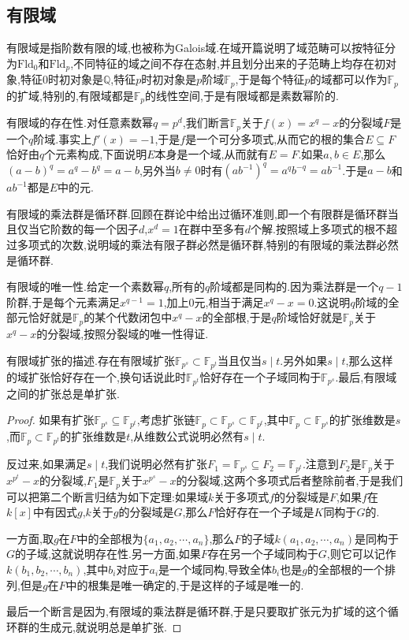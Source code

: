 \subsection{有限域}

有限域是指阶数有限的域,也被称为Galois域.在域开篇说明了域范畴可以按特征分为$\mathrm{Fld}_0$和$\mathrm{Fld}_p$,不同特征的域之间不存在态射,并且划分出来的子范畴上均存在初对象,特征0时初对象是$\mathbb{Q}$,特征$p$时初对象是$p$阶域$\mathbb{F}_p$,于是每个特征$p$的域都可以作为$\mathbb{F}_p$的扩域,特别的,有限域都是$\mathbb{F}_p$的线性空间,于是有限域都是素数幂阶的.

有限域的存在性.对任意素数幂$q=p^d$,我们断言$\mathbb{F}_p$关于$f(x)=x^q-x$的分裂域$F$是一个$q$阶域.事实上$f'(x)=-1$,于是$f$是一个可分多项式,从而它的根的集合$E\subseteq F$恰好由$q$个元素构成,下面说明$E$本身是一个域,从而就有$E=F$.如果$a,b\in E$,那么$(a-b)^q=a^q-b^q=a-b$,另外当$b\not=0$时有$(ab^{-1})^q=a^qb^{-q}=ab^{-1}$.于是$a-b$和$ab^{-1}$都是$E$中的元.

有限域的乘法群是循环群.回顾在群论中给出过循环准则,即一个有限群是循环群当且仅当它阶数的每一个因子$d$,$x^d=1$在群中至多有$d$个解.按照域上多项式的根不超过多项式的次数,说明域的乘法有限子群必然是循环群,特别的有限域的乘法群必然是循环群.

有限域的唯一性.给定一个素数幂$q$,所有的$q$阶域都是同构的.因为乘法群是一个$q-1$阶群,于是每个元素满足$x^{q-1}=1$,加上0元,相当于满足$x^{q}-x=0$.这说明$q$阶域的全部元恰好就是$\mathbb{F}_p$的某个代数闭包中$x^q-x$的全部根,于是$q$阶域恰好就是$\mathbb{F}_p$关于$x^q-x$的分裂域,按照分裂域的唯一性得证.

有限域扩张的描述.存在有限域扩张$\mathbb{F}_{p^s}\subset\mathbb{F}_{p^t}$当且仅当$s\mid t$.另外如果$s\mid t$,那么这样的域扩张恰好存在一个,换句话说此时$\mathbb{F}_{p^t}$恰好存在一个子域同构于$\mathbb{F}_{p^s}$.最后,有限域之间的扩张总是单扩张.
\begin{proof}

如果有扩张$\mathbb{F}_{p^s}\subseteq \mathbb{F}_{p^t}$,考虑扩张链$\mathbb{F}_p\subset\mathbb{F}_{p^s}\subset\mathbb{F}_{p^t}$,其中$\mathbb{F}_p\subset\mathbb{F}_{p^s}$的扩张维数是$s$,而$\mathbb{F}_p\subset\mathbb{F}_{p^t}$的扩张维数是$t$,从维数公式说明必然有$s\mid t$.

反过来,如果满足$s\mid t$,我们说明必然有扩张$F_1=\mathbb{F}_{p^s}\subseteq F_2=\mathbb{F}_{p^t}$.注意到$F_2$是$\mathbb{F}_p$关于$x^{p^t}-x$的分裂域,$F_1$是$\mathbb{F}_p$关于$x^{p^s}-x$的分裂域,这两个多项式后者整除前者,于是我们可以把第二个断言归结为如下定理:如果域$k$关于多项式$f$的分裂域是$F$,如果$f$在$k[x]$中有因式$g$,$k$关于$g$的分裂域是$G$,那么$F$恰好存在一个子域是$K$同构于$G$的.

一方面,取$g$在$F$中的全部根为$\{a_1,a_2,\cdots,a_n\}$,那么$F$的子域$k(a_1,a_2,\cdots,a_n)$是同构于$G$的子域,这就说明存在性.另一方面,如果$F$存在另一个子域同构于$G$,则它可以记作$k(b_1,b_2,\cdots,b_n)$,其中$b_i$对应于$a_i$是一个域同构,导致全体$b_i$也是$g$的全部根的一个排列,但是$g$在$F$中的根集是唯一确定的,于是这样的子域是唯一的.

最后一个断言是因为,有限域的乘法群是循环群,于是只要取扩张元为扩域的这个循环群的生成元,就说明总是单扩张.
\end{proof}

